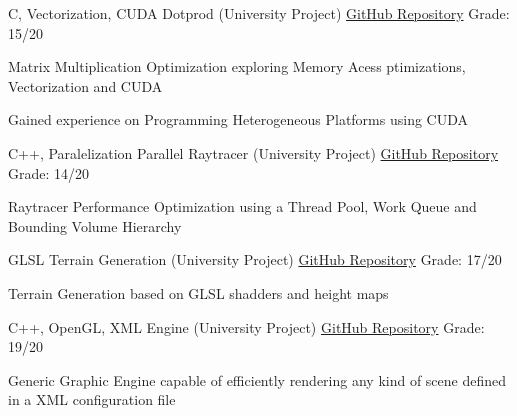 


\begin{cventries}


\cventry
{C, Vectorization, CUDA} %
  {Dotprod (University Project)} %
{\href{https://github.com/JoseFilipeFerreira/dotprod}{GitHub Repository}} %
{Grade: 15/20} %
{ %
\begin{cvitems}
\item {Matrix Multiplication Optimization exploring Memory Acess ptimizations,
  Vectorization and CUDA}
\item {Gained experience on Programming Heterogeneous Platforms using CUDA}
\end{cvitems}
}


\cventry
{C++, Paralelization} %
  {Parallel Raytracer (University Project)} %
{\href{https://github.com/JoseFilipeFerreira/parallel-raytracer}{GitHub Repository}} %
{Grade: 14/20} %
{ %
\begin{cvitems}
\item {Raytracer Performance Optimization using a Thread Pool, Work Queue
  and Bounding Volume Hierarchy}
\end{cvitems}
}


\cventry
{GLSL} %
  {Terrain Generation (University Project)} %
{\href{https://github.com/JoseFilipeFerreira/TerrainGeneration}{GitHub Repository}} %
{Grade: 17/20} %
{ %
\begin{cvitems}
\item {Terrain Generation based on GLSL shadders and height maps}
\end{cvitems}
}


\cventry
{C++, OpenGL, XML} %
  {Engine (University Project)} %
{\href{https://github.com/JoseFilipeFerreira/engine}{GitHub Repository}} %
{Grade: 19/20} %
{ %
\begin{cvitems}
\item {Generic Graphic Engine capable of efficiently rendering any kind of scene
  defined in a XML configuration file}
\end{cvitems}
}


\end{cventries}
